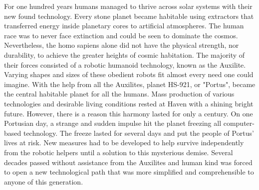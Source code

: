 \documentclass[../Main.tex]{subfiles}
\begin{document}
For one hundred years humans managed to thrive across solar systems with their new found technology. Every stone planet became habitable using extractors that transferred energy inside planetary cores to artificial atmospheres. The human race was to never face extinction and could be seen to dominate the cosmos. Nevertheless, the homo sapiens alone did not have the physical strength, nor durability, to achieve the greater heights of cosmic habitation. The majority of their forces consisted of a robotic humanoid technology, known as the Auxilite. Varying shapes and sizes of these obedient robots fit almost every need one could imagine. With the help from all the Auxilites, planet HS-921, or "Portus", became the central habitable planet for all the humans. Mass production of various technologies and desirable living conditions rested at Haven with a shining bright future. However, there is a reason this harmony lasted for only a century. On one Portusian day, a strange and sudden impulse hit the planet freezing all computer-based technology. The freeze lasted for several days and put the people of Portus' lives at risk. New measures had to be developed to help survive independently from the robotic helpers until a solution to this mysterious demise. Several decades passed without assistance from the Auxilites and human kind was forced to open a new technological path that was more simplified and comprehensible to anyone of this generation. 
\end{document}
